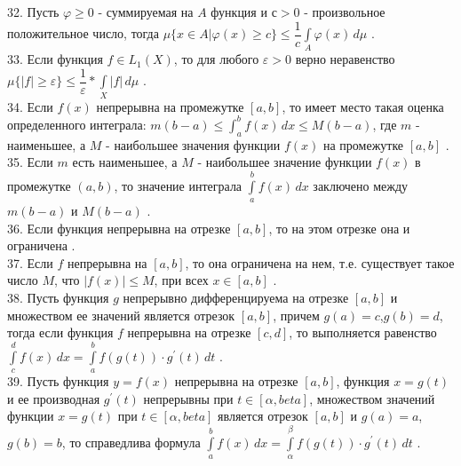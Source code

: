 \documentclass[12pt]{article}
\begin{document}
{{32. Пусть ${\displaystyle \varphi \geq 0}$ - суммируемая на ${\displaystyle A}$ функция и ${\displaystyle с>0}$ - произвольное положительное число, тогда ${\displaystyle \mu\{x \in A \vert \varphi(x) \geq c\} \leq \dfrac{1}{c}\int \limits _{A} \varphi(x) \, d\mu}$ .\\

33. Если функция ${\displaystyle f \in L_1(X)}$, то для любого ${\displaystyle \varepsilon>0}$ верно неравенство ${\displaystyle \mu\{|f| \geq \varepsilon\} \leq \dfrac{1}{\varepsilon}*\int \limits _{X} |f| \, d\mu}$ .\\

34. Если ${\displaystyle f(x)}$ непрерывна на промежутке ${\displaystyle [a,b]}$, то имеет место такая оценка определенного интеграла: ${\displaystyle m(b-a)\leq \int _{a}^{b} f(x)\,dx\leq M(b-a)}$, где ${\displaystyle m}$ - наименьшее, а ${\displaystyle M}$ - наибольшее значения функции ${\displaystyle f(x)}$ на промежутке ${\displaystyle [a,b]}$ .\\

35. Если ${\displaystyle m}$ есть наименьшее, а ${\displaystyle M}$ - наибольшее значение функции ${\displaystyle f(x)}$ в промежутке ${\displaystyle (a,b)}$, то значение интеграла ${\displaystyle \int \limits _{a}^{b} f(x) \, dx}$ заключено между ${\displaystyle m(b-a)}$ и ${\displaystyle M(b-a)}$ .\\

36. Если функция непрерывна на отрезке  ${\displaystyle [a,b]}$, то на этом отрезке она и ограничена .\\

37. Если ${\displaystyle f}$ непрерывна на ${\displaystyle [a,b]}$, то она ограничена на нем, т.е. существует такое число ${\displaystyle M}$, что ${\displaystyle |f(x)| \leq M}$, при всех ${\displaystyle x \in [a,b]}$ .\\

38. Пусть функция ${\displaystyle g}$ непрерывно дифференцируема на отрезке ${\displaystyle [a,b]}$ и множеством ее значений является отрезок ${\displaystyle [a,b]}$, причем ${\displaystyle g(a)=c}$,${\displaystyle g(b)=d}$, тогда если функция ${\displaystyle f}$ непрерывна на отрезке ${\displaystyle [c,d]}$, то выполняется равенство ${\displaystyle \int \limits _{c}^{d} f(x) \, dx=\int \limits _{a}^{b} f(g(t))\cdot g^{\prime}(t) \, dt}$ .\\

39. Пусть функция ${\displaystyle y = f(x)}$ непрерывна на отрезке ${\displaystyle [a,b]}$, функция ${\displaystyle x = g(t)}$ и ее производная ${\displaystyle g^{\prime}(t)}$ непрерывны при ${\displaystyle t \in [\alpha,beta]}$, множеством значений функции ${\displaystyle x = g(t)}$ при ${\displaystyle t \in [\alpha,beta]}$ является отрезок ${\displaystyle [a,b]}$ и ${\displaystyle g(a) = a}$, ${\displaystyle g(b) = b}$, то справедлива формула ${\displaystyle \int \limits _{a}^{b} f(x) \, dx=\int \limits _{\alpha}^{\beta} f(g(t))\cdot g^{\prime}(t) \, dt}$ .\\

}}
\end{document}
